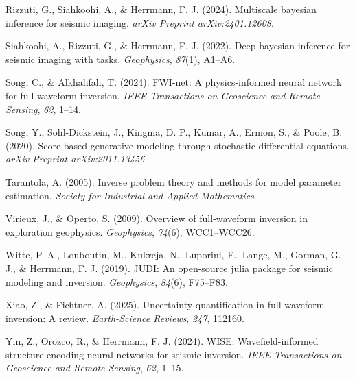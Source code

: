 \documentclass{IMAGE2025}
\begin{document}
\begin{CSLReferences}{1}{0}
Rizzuti, G., Siahkoohi, A., \& Herrmann, F. J. (2024). Multiscale
bayesian inference for seismic imaging. \emph{arXiv Preprint
arXiv:2401.12608}.

Siahkoohi, A., Rizzuti, G., \& Herrmann, F. J. (2022). Deep bayesian
inference for seismic imaging with tasks. \emph{Geophysics},
\emph{87}(1), A1--A6.

Song, C., \& Alkhalifah, T. (2024). FWI-net: A physics-informed neural
network for full waveform inversion. \emph{IEEE Transactions on
Geoscience and Remote Sensing}, \emph{62}, 1--14.

Song, Y., Sohl-Dickstein, J., Kingma, D. P., Kumar, A., Ermon, S., \&
Poole, B. (2020). Score-based generative modeling through stochastic
differential equations. \emph{arXiv Preprint arXiv:2011.13456}.

Tarantola, A. (2005). Inverse problem theory and methods for model
parameter estimation. \emph{Society for Industrial and Applied
Mathematics}.

Virieux, J., \& Operto, S. (2009). Overview of full-waveform inversion
in exploration geophysics. \emph{Geophysics}, \emph{74}(6), WCC1--WCC26.

Witte, P. A., Louboutin, M., Kukreja, N., Luporini, F., Lange, M.,
Gorman, G. J., \& Herrmann, F. J. (2019). JUDI: An open-source julia
package for seismic modeling and inversion. \emph{Geophysics},
\emph{84}(6), F75--F83.

Xiao, Z., \& Fichtner, A. (2025). Uncertainty quantification in full
waveform inversion: A review. \emph{Earth-Science Reviews}, \emph{247},
112160.

Yin, Z., Orozco, R., \& Herrmann, F. J. (2024). WISE: Wavefield-informed
structure-encoding neural networks for seismic inversion. \emph{IEEE
Transactions on Geoscience and Remote Sensing}, \emph{62}, 1--15.

\end{CSLReferences}


\end{document}
